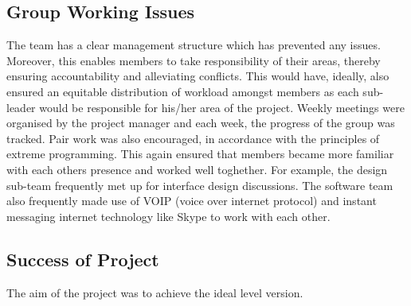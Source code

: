 \subsection{Group Working Issues}

The team has a clear management structure which has prevented any issues. Moreover, this enables members to take responsibility of their areas, thereby ensuring accountability and alleviating conflicts. This would have, ideally, also ensured an equitable distribution of workload amongst members as each sub-leader would be responsible for his/her area of the project.
Weekly meetings were organised by the project manager and each week, the progress of the group was tracked. Pair work was also encouraged, in accordance with the principles of extreme programming. This again ensured that members became more familiar with each others presence and worked well toghether. For example, the design sub-team frequently met up for interface design discussions. The software team also frequently made use of VOIP (voice over internet protocol) and instant messaging internet technology like Skype to work with each other.

\subsection{Success of Project}
The aim of the project was to achieve the ideal level version.
